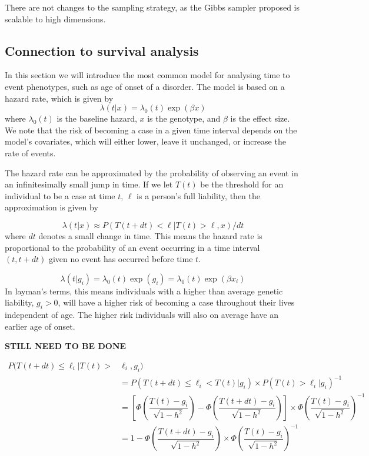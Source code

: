 There are not changes to the sampling strategy, as the Gibbs sampler proposed is scalable to high dimensions.


\subsection{Connection to survival analysis}


In this section we will introduce the most common model for analysing time to event phenotypes, such as age of onset of a disorder. The model is based on a hazard rate, which is given by 
\begin{equation}
\lambda(t | x) = \lambda_0(t)\exp(\beta x)
\end{equation}
where $ \lambda_0(t) $ is the baseline hazard, $ x $ is the genotype, and $ \beta $ is the effect size. We note that the risk of becoming a case in a given time interval depends on the model's covariates, which will either lower, leave it unchanged, or increase the rate of events.

The hazard rate can be approximated by the probability of observing an event in an infinitesimally small jump in time\cite{kragh2021analysis}. If we let $ T(t) $ be the threshold for an individual to be a case at time $ t $, $ \ell $ is a person's full liability, then the approximation is given by

\begin{equation}
\lambda(t|x) \approx 
P(T(t + dt) < \ell | T(t) > \ell, x) / dt
\end{equation}
where $ dt $ denotes a small change in time. This means the hazard rate is proportional to the probability of an event occurring in a time interval $ (t, t + dt) $ given no event has occurred before time $ t $.

\begin{equation}
\lambda(t | g_i) = \lambda_0(t) \exp(g_i) = \lambda_0(t) \exp(\beta x_i)
\end{equation}
In layman's terms, this means individuals with a higher than average genetic liability, $ g_i > 0 $, will have a higher risk of becoming a case throughout their lives independent of age. The higher risk individuals will also on average have an earlier age of onset.

\textbf{STILL NEED TO BE DONE}



\begin{align}
P(T(t + dt) \leq \ell_i | T(t) >& \ell_i, g_i)  \\
&=P(T(t + dt) \leq \ell_i < T(t)|g_i) \times P(T(t) > \ell_i | g_i)^{-1}  \\
&=
\left[\Phi\left( \dfrac{T(t) - g_i}{\sqrt{1 - h^2}}\right) - \Phi\left( \dfrac{T(t + dt) - g_i}{\sqrt{1 - h^2}}\right)\right] \times
\Phi \left( \dfrac{T(t) - g_i}{\sqrt{1 - h^2}}\right)^{-1} \\
&=
1 - \Phi\left( \dfrac{T(t + dt) - g_i}{\sqrt{1 - h^2}}\right) \times \Phi\left( \dfrac{T(t) - g_i}{\sqrt{1 - h^2}}\right)^{-1}
\end{align}

